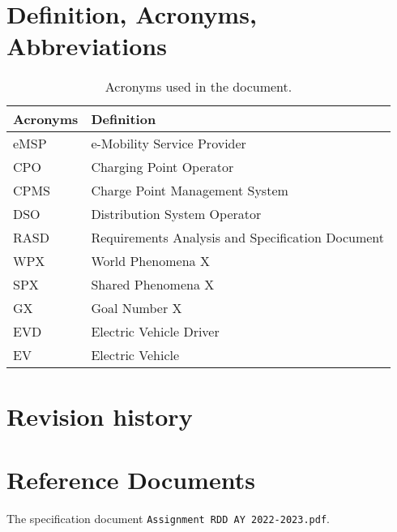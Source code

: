 \section{Definition, Acronyms, Abbreviations}
\label{sec:definition_acronyms_abbreviations}
\begin{table}[H]
    \begin{center}
        \begin{tabular}{ |l|l| }
            \hline
            \textbf{Acronyms} & \textbf{Definition}                              \\
            \hline
            eMSP              & e-Mobility Service Provider                      \\
            \hline
            CPO               & Charging Point Operator                          \\
            \hline
            CPMS              & Charge Point Management System                   \\
            \hline
            DSO               & Distribution System Operator                     \\
            \hline
            RASD              & Requirements Analysis and Specification Document \\
            \hline
            WPX               & World Phenomena X                                \\
            \hline
            SPX               & Shared Phenomena X                               \\
            \hline
            GX                & Goal Number X                                    \\
            \hline
            EVD               & Electric Vehicle Driver                          \\
            \hline
            EV                & Electric Vehicle                                 \\
            \hline
        \end{tabular}
        \caption{Acronyms used in the document.}
        \label{tab:acronyms}
    \end{center}
\end{table}


\section{Revision history}
\label{sec:revision_history}


\section{Reference Documents}
\label{sec:reference_documents}
The specification document \verb|Assignment RDD AY 2022-2023.pdf|.


